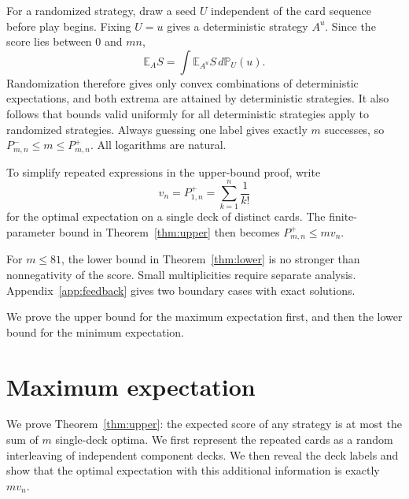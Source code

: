 \documentclass[11pt,reqno]{amsart}
\numberwithin{equation}{section}
\theoremstyle{remark}
\theoremstyle{definition}
\begin{document}
For a randomized strategy, draw a seed $U$ independent of the card sequence before play begins. Fixing $U=u$ gives a deterministic strategy $A^u$. Since the score lies between 0 and $mn$,
\[
 \mathbb E_A S=\int\mathbb E_{A^u}S\,d\mathbb P_U(u).
\]
Randomization therefore gives only convex combinations of deterministic expectations, and both extrema are attained by deterministic strategies. It also follows that bounds valid uniformly for all deterministic strategies apply to randomized strategies. Always guessing one label gives exactly $m$ successes, so $P^-_{m,n}\le m\le P^+_{m,n}$. All logarithms are natural.

To simplify repeated expressions in the upper-bound proof, write
\[
 v_n=P^+_{1,n}=\sum_{k=1}^{n}\frac1{k!}
\]
for the optimal expectation on a single deck of distinct cards. The finite-parameter bound in Theorem~\ref{thm:upper} then becomes $P^+_{m,n}\le mv_n$.

For $m\le81$, the lower bound in Theorem~\ref{thm:lower} is no stronger than nonnegativity of the score. Small multiplicities require separate analysis. Appendix~\ref{app:feedback} gives two boundary cases with exact solutions.

We prove the upper bound for the maximum expectation first, and then the lower bound for the minimum expectation.

\section{Maximum expectation}\label{sec:maximum}
We prove Theorem~\ref{thm:upper}: the expected score of any strategy is at most the sum of $m$ single-deck optima. We first represent the repeated cards as a random interleaving of independent component decks. We then reveal the deck labels and show that the optimal expectation with this additional information is exactly $mv_n$.
\end{document}
